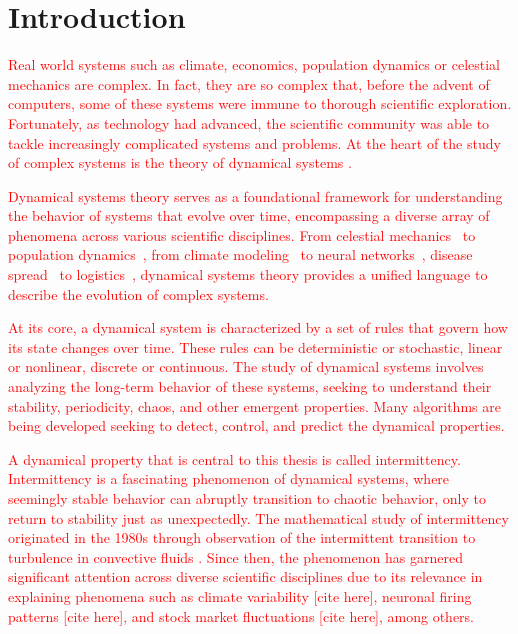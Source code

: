 \chapter{Introduction}
\label{sec:Introduction}

\textcolor{red}{
Real world systems such as climate, economics, population dynamics or celestial mechanics are complex.
In fact, they are so complex that, before the advent of computers, some of these systems were immune to thorough scientific exploration.
Fortunately, as technology had advanced, the scientific community was able to tackle increasingly complicated systems and problems.
At the heart of the study of complex systems is the theory of dynamical systems \cite{Devaney20211026, Hirsch2013, Strogatz201854}.
}
\par
\textcolor{red}{
Dynamical systems theory serves as a foundational framework for understanding the behavior of systems that evolve over time, encompassing a diverse array of phenomena across various scientific disciplines.
From celestial mechanics~\cite{Holmes1990} to population dynamics~\cite{Hastings1993,Hadeler2001}, from climate modeling~\cite{Ghil2023} to neural networks~\cite{Cessac2009, Vogt2020, Li2019}, disease spread~\cite{Ritelli20210930} to logistics~\cite{Kumara2003}, dynamical systems theory provides a unified language to describe the evolution of complex systems.
}
\par
\textcolor{red}{
At its core, a dynamical system is characterized by a set of rules that govern how its state changes over time.
These rules can be deterministic or stochastic, linear or nonlinear, discrete or continuous.
The study of dynamical systems involves analyzing the long-term behavior of these systems, seeking to understand their stability, periodicity, chaos, and other emergent properties.
Many algorithms are being developed seeking to detect, control, and predict the dynamical properties.
}
\par
\textcolor{red}{
A dynamical property that is central to this thesis is called intermittency.
Intermittency is a fascinating phenomenon of dynamical systems, where seemingly stable behavior can abruptly transition to chaotic behavior, only to return to stability just as unexpectedly.
The mathematical study of intermittency originated in the 1980s through observation of the intermittent transition to turbulence in convective fluids \cite{Pomeau1980}.
Since then, the phenomenon has garnered significant attention across diverse scientific disciplines due to its relevance in explaining phenomena such as climate variability [cite here], neuronal firing patterns [cite here], and stock market fluctuations [cite here], among others.
}
